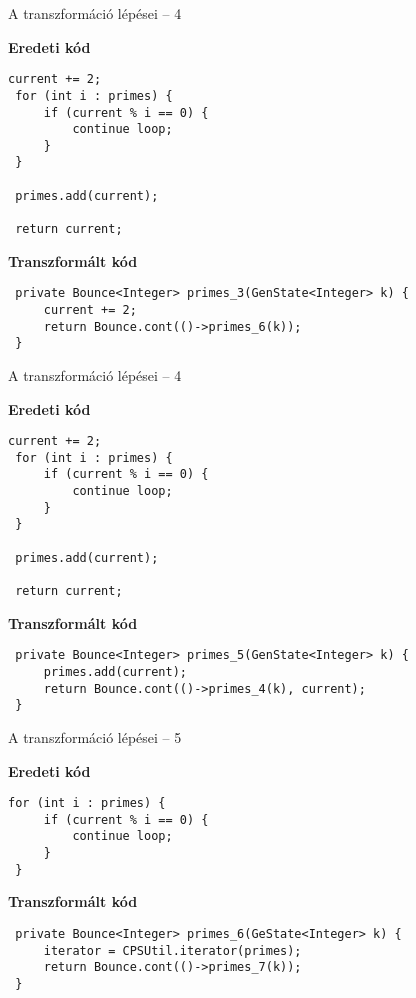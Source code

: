 \begin{frame}[fragile]{A transzformáció lépései -- 4}
\begin{center}\textbf{Eredeti kód}\end{center}
\begin{lstlisting}[linebackgroundcolor={
            \btLstHL<1>{1}
        }]
 current += 2;
 for (int i : primes) {
     if (current % i == 0) {
         continue loop;
     }
 }
 
 primes.add(current);
 
 return current;
\end{lstlisting}

\begin{center}\textbf{Transzformált kód}\end{center}
\begin{lstlisting}
 private Bounce<Integer> primes_3(GenState<Integer> k) {
     current += 2;
     return Bounce.cont(()->primes_6(k));
 }
\end{lstlisting}
\end{frame}

\begin{frame}[fragile]{A transzformáció lépései -- 4}
\begin{center}\textbf{Eredeti kód}\end{center}
\begin{lstlisting}[linebackgroundcolor={
            \btLstHL<1>{8-10}
        }]
 current += 2;
 for (int i : primes) {
     if (current % i == 0) {
         continue loop;
     }
 }
 
 primes.add(current);
 
 return current;
\end{lstlisting}

\begin{center}\textbf{Transzformált kód}\end{center}
\begin{lstlisting}
 private Bounce<Integer> primes_5(GenState<Integer> k) {
     primes.add(current);
     return Bounce.cont(()->primes_4(k), current);
 }
\end{lstlisting}
\addtocounter{framenumber}{-1}
\end{frame}



\begin{frame}[fragile]{A transzformáció lépései -- 5}
\begin{center}\textbf{Eredeti kód}\end{center}
\begin{lstlisting}[linebackgroundcolor={
            \btLstHL<1>{1}
        }]
 for (int i : primes) {
     if (current % i == 0) {
         continue loop;
     }
 }
\end{lstlisting}

\begin{center}\textbf{Transzformált kód}\end{center}
\begin{lstlisting}
 private Bounce<Integer> primes_6(GeState<Integer> k) {
     iterator = CPSUtil.iterator(primes);
     return Bounce.cont(()->primes_7(k));
 }
\end{lstlisting}
\end{frame}


